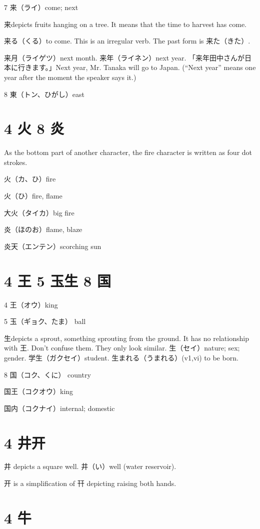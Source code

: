 7 来（ライ）come; next

来depicts fruits hanging on a tree.
It means that the time to harvest has come.

来る（くる）to come. This is an irregular verb. The past form is 来た（きた）.

来月（ライゲツ）next month.
来年（ライネン）next year.
「来年田中さんが日本に行きます。」Next year, Mr. Tanaka will go to Japan.
(``Next year'' means one year after the moment the speaker says it.)

8 東（トン、ひがし）east

\section{4 火 8 炎}

As the bottom part of another character,
the fire character is written as four dot strokes.

火（カ、ひ）fire

火（ひ）fire, flame

大火（タイカ）big fire

炎（ほのお）flame, blaze

炎天（エンテン）scorching sun

\section{4 王 5 玉生 8 国}

4 王（オウ）king

5 玉（ギョク、たま） ball

生depicts a sprout, something sprouting from the ground.
It has no relationship with 王.
Don't confuse them.
They only look similar.
生（セイ）nature; sex; gender.
学生（ガクセイ）student.
生まれる（うまれる）(v1,vi) to be born.

8 国（コク、くに） country

国王（コクオウ）king

国内（コクナイ）internal; domestic

\section{4 井开}

井 depicts a square well.
井（い）well (water reservoir).

开 is a simplification of 幵 depicting raising both hands.

\section{4 牛}


